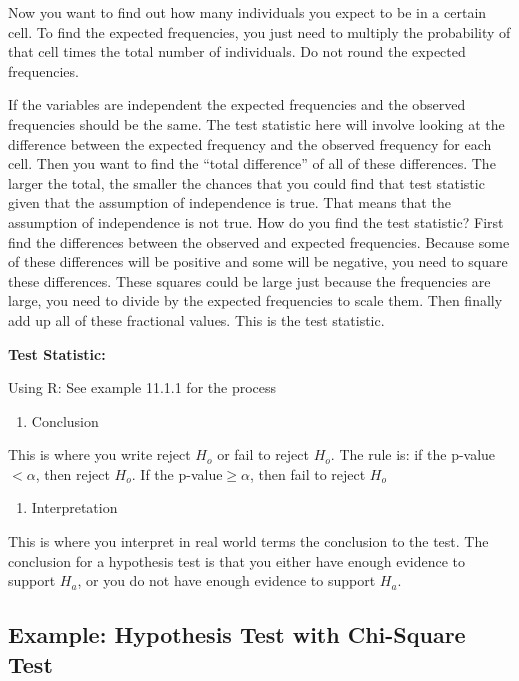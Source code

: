 \documentclass[]{book}
\providecommand{\tightlist}{%
  \setlength{\itemsep}{0pt}\setlength{\parskip}{0pt}}
\begin{document}
Now you want to find out how many individuals you expect to be in a certain cell. To find the expected frequencies, you just need to multiply the probability of that cell times the total number of individuals. Do not round the expected frequencies.

If the variables are independent the expected frequencies and the observed frequencies should be the same. The test statistic here will involve looking at the difference between the expected frequency and the observed frequency for each cell. Then you want to find the ``total difference'' of all of these differences. The larger the total, the smaller the chances that you could find that test statistic given that the assumption of independence is true. That means that the assumption of independence is not true. How do you find the test statistic? First find the differences between the observed and expected frequencies. Because some of these differences will be positive and some will be negative, you need to square these differences. These squares could be large just because the frequencies are large, you need to divide by the expected frequencies to scale them. Then finally add up all of these fractional values. This is the test statistic.

\textbf{Test Statistic:}

Using R: See example 11.1.1 for the process

\begin{enumerate}
\def\labelenumi{\arabic{enumi}.}
\setcounter{enumi}{3}
\tightlist
\item
  Conclusion
\end{enumerate}

This is where you write reject \(H_o\) or fail to reject \(H_o\). The rule is: if the p-value \(<\alpha\), then reject \(H_o\). If the p-value\(\ge \alpha\), then fail to reject \(H_o\)

\begin{enumerate}
\def\labelenumi{\arabic{enumi}.}
\setcounter{enumi}{4}
\tightlist
\item
  Interpretation
\end{enumerate}

This is where you interpret in real world terms the conclusion to the test. The conclusion for a hypothesis test is that you either have enough evidence to support \(H_a\), or you do not have enough evidence to support \(H_a\).

\hypertarget{example-hypothesis-test-with-chi-square-test}{%
\subsection{Example: Hypothesis Test with Chi-Square Test}\label{example-hypothesis-test-with-chi-square-test}}
\end{document}

